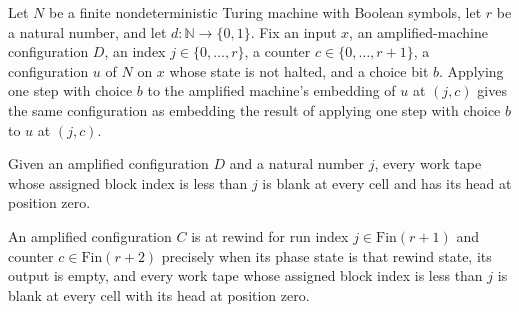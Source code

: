 \begin{theorem}
\label{Randomized.Amplify.step_emb}
\leanok
{}
Let $N$ be a finite nondeterministic Turing machine with Boolean symbols, let $r$ be a
natural number, and let $d\colon\mathbb{N}\to\{0,1\}$. Fix an input $x$, an
amplified-machine configuration $D$, an index $j\in\{0,\ldots,r\}$, a counter
$c\in\{0,\ldots,r+1\}$, a configuration $u$ of $N$ on $x$ whose state is not halted, and
a choice bit $b$. Applying one step with choice $b$ to the amplified machine's embedding
of $u$ at $(j,c)$ gives the same configuration as embedding the result of applying one
step with choice $b$ to $u$ at $(j,c)$.
\end{theorem}

\begin{definition}
\label{Randomized.Amplify.Fresh}
\leanok
{}
Given an amplified configuration $D$ and a natural number $j$, every work tape whose
assigned block index is less than $j$ is blank at every cell and has its head at
position zero.
\end{definition}

\begin{definition}
\label{Randomized.Amplify.RewindAt}
\leanok
{}
An amplified configuration $C$ is at rewind for run index $j\in\text{Fin}(r+1)$ and
counter $c\in\text{Fin}(r+2)$ precisely when its phase state is that rewind state, its
output is empty, and every work tape whose assigned block index is less than $j$ is
blank at every cell with its head at position zero.
\end{definition}

